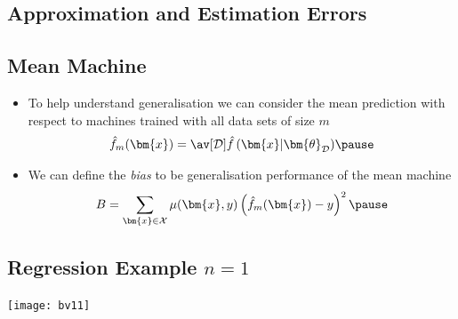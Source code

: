 
\begin{slide}
\section[-2]{Approximation and Estimation Errors}
\pb\pause{}
\begin{center}
  \pause
\end{center}

\end{slide}


\begin{slide}
\section{Mean Machine}

\begin{PauseHighLight}
  \begin{itemize}
  \item To help understand generalisation we can consider the mean
    prediction with respect to machines trained with all data sets of
    size $m$
    \begin{align*}
      \hat{f}_m(\bm{x}) = \av[\mathcal{D}]{ \hat{f}\left(\bm{x} |
      \bm{\theta}_{\mathcal{D}}\right)} \pause
    \end{align*}
  \item We can define the \emph{bias} to be generalisation performance
    of the mean machine
    \begin{align*}
      B = \sum_{\bm{x}\in\mathcal{X}} \mu(\bm{x},y) \left( \hat{f}_m(\bm{x})
      - y \right)^2\pause
    \end{align*}
  \end{itemize}
\end{PauseHighLight}

\end{slide}



\whitepage
\begin{slide}
\section[-1]{Regression Example $n=1$}

\pb\pause{}
\begin{center}
  \texttt{[image: bv11]}\pause
  \llap{\texttt{[image: bv12]}}\pause
  \llap{\texttt{[image: bv13]}}\pause
  \llap{\texttt{[image: bv14]}}\pause
\end{center}

\end{slide}



